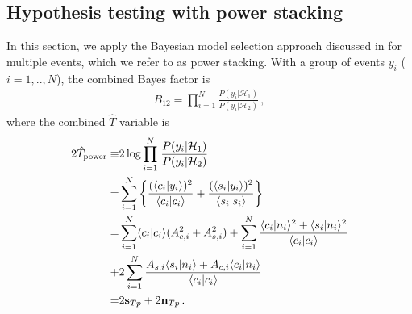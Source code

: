 \documentclass[prd,aps,floatfix,superscriptaddress,nofootinbib,twocolumn,10pt,English]{revtex4-1}
\begin{document}
\subsection{Hypothesis testing with power stacking}\label{sec:power}

In this section, we apply the Bayesian model selection approach discussed in \cite{meidam2014testing} for multiple events, which we refer to as 
power stacking.
%
With a group of events $y_i$ ($i=1,..,N$), the combined Bayes factor is \cite{meidam2014testing}
\begin{align}
B_{12} =\prod^N_{i=1} \frac{P( y_i | \mathcal{H}_1 )}{P( y_i | \mathcal{H}_2 )}\,,
\end{align}
where  the combined $\hat{T}$ variable is
\begin{align}\label{eqpowers}
2 \hat{T}_{\rm power}  \equiv & 2 \log \prod^N_{i=1} \left . \frac{P(y_i|\mathcal H_1)}{P(y_i|\mathcal H_2)} \right . \nonumber \\
=& \sum^N_{i=1} \left \{ \frac{(\langle c_i | y_i \rangle)^2}{ \langle c_i | c_i \rangle}+\frac{(\langle s_i | y_i \rangle)^2}{ \langle s_i | s_i \rangle}\right \} \nonumber \\
 =&\sum^N_{i=1} \langle c_i| c_i \rangle (A^2_{c,i}+A^2_{s,i})+\sum^N_{i=1} \frac{\langle c_i | n_i \rangle^2+\langle s_i | n_i \rangle^2}{\langle c_i | c_i \rangle } \nonumber \\
+& 2\sum^N_{i=1} \frac{A_{s,i} \langle s_i | n_i \rangle+A_{c,i} \langle c_i | n_i \rangle}{\langle c_i | c_i \rangle} \nonumber \\
=&2 \mathbf{s}_{Tp}+2 \mathbf{n}_{Tp}\,.
\end{align}
\end{document}
